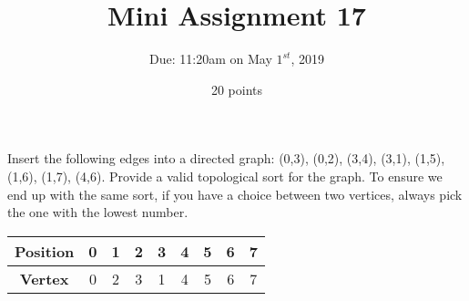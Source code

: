 \documentclass[12pt]{article}
\begin{document}
 
\title{Mini Assignment 17}
\author{Due: 11:20am on May $1^{st}$, 2019}
\date{20 points}
\maketitle

Insert the following edges into a directed graph: (0,3), (0,2), (3,4), (3,1), (1,5), (1,6), (1,7), (4,6). Provide a valid topological sort for the graph. To ensure we end up with the same sort, if you have a choice between two vertices, always pick the one with the lowest number.

\begin{center}
	\def\arraystretch{1.3}
	\begin{tabular}{|c|c|c|c|c|c|c|c|c|}
		\hline
		\textbf{Position} & 0 & 1 & 2 & 3 & 4 & 5 & 6 & 7 \\
		\hline
		\hline
		\textbf{Vertex} & 0 & 2 & 3 & 1 & 4 & 5 & 6 & 7 \\
		\hline
	\end{tabular}
\end{center}
\end{document}
